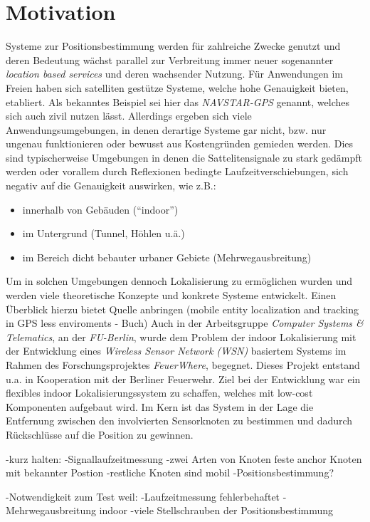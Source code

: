 \section{Motivation}
\label{sec:motivation}

Systeme zur Positionsbestimmung werden für zahlreiche Zwecke genutzt und deren Bedeutung wächst parallel zur
Verbreitung immer neuer sogenannter \textit{location based services} und deren wachsender Nutzung.
Für Anwendungen im Freien haben sich satelliten gestütze Systeme, welche hohe Genauigkeit bieten, etabliert.
Als bekanntes Beispiel sei hier das \textit{NAVSTAR-GPS} genannt, welches sich auch zivil nutzen lässt.
Allerdings ergeben sich viele Anwendungsumgebungen, in denen derartige Systeme gar nicht, bzw.
nur ungenau funktionieren oder bewusst aus Kostengründen gemieden werden. 
Dies sind typischerweise Umgebungen in denen die Sattelitensignale zu stark gedämpft werden oder
vorallem durch Reflexionen bedingte Laufzeitverschiebungen, sich negativ auf die Genauigkeit auswirken, wie z.B.: 


\begin{itemize}
  \item innerhalb von Gebäuden (``indoor'')
  \item im Untergrund (Tunnel, Höhlen u.ä.)
  \item im Bereich dicht bebauter urbaner Gebiete (Mehrwegausbreitung)
\end{itemize}

Um in solchen Umgebungen dennoch Lokalisierung zu ermöglichen wurden und werden viele theoretische Konzepte und 
konkrete Systeme entwickelt. Einen Überblick hierzu bietet
Quelle anbringen (mobile entity localization and tracking in GPS less enviroments - Buch)
Auch in der Arbeitsgruppe \textit{Computer Systems \& Telematics}, an der \textit{FU-Berlin}, 
wurde dem Problem der indoor Lokalisierung mit der Entwicklung eines \textit{Wireless Sensor Network (WSN)}
basiertem Systems im Rahmen des Forschungsprojektes \textit{FeuerWhere}, begegnet. 
Dieses Projekt entstand u.a. in Kooperation mit der Berliner Feuerwehr.
Ziel bei der Entwicklung war ein flexibles indoor Lokalisierungssystem zu schaffen, welches mit
low-cost Komponenten aufgebaut wird. 
Im Kern ist das System in der Lage die Entfernung zwischen den involvierten Sensorknoten zu bestimmen und 
dadurch Rückschlüsse auf die Position zu gewinnen.

-kurz halten:
-Signallaufzeitmessung
-zwei Arten von Knoten feste anchor Knoten mit bekannter Postion 
-restliche Knoten sind mobil
-Positionsbestimmung?

-Notwendigkeit zum Test weil:
  -Laufzeitmessung fehlerbehaftet
  -Mehrwegausbreitung indoor
  -viele Stellschrauben der Positionsbestimmung

